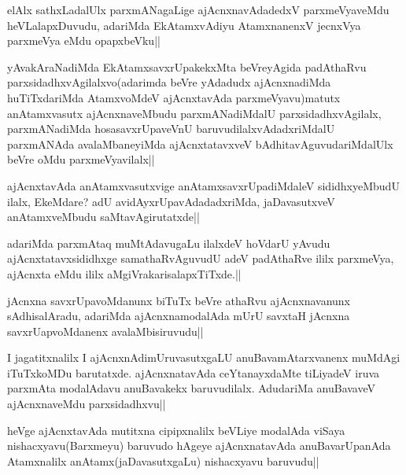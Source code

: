 \begin{artha}
elAlx sathxLadalUlx parxmANagaLige ajAcnxnavAdadedxV parxmeVyaveMdu heVLalapxDuvudu, adariMda EkAtamxvAdiyu AtamxnanenxV jecnxVya parxmeVya eMdu opapxbeVku||
\end{artha}

\begin{artha}
yAvakAraNadiMda EkAtamxsavxrUpakekxMta beVreyAgida padAthaRvu parxsidadhxvAgilalxvo(adarimda beVre yAdadudx ajAcnxnadiMda huTiTxdariMda AtamxvoMdeV ajAcnxtavAda parxmeVyavu)matutx anAtamxvasutx ajAcnxnaveMbudu parxmANadiMdalU parxsidadhxvAgilalx, parxmANadiMda hosasavxrUpaveVnU baruvudilalxvAdadxriMdalU parxmANAda avalaMbaneyiMda ajAcnxtatavxveV bAdhitavAguvudariMdalUlx beVre oMdu parxmeVyavilalx||
\end{artha}

\begin{artha}
ajAcnxtavAda anAtamxvasutxvige anAtamxsavxrUpadiMdaleV sididhxyeMbudU ilalx, EkeMdare? adU avidAyxrUpavAdadadxriMda, jaDavasutxveV anAtamxveMbudu saMtavAgirutatxde||
\end{artha}

\begin{artha}
adariMda parxmAtaq muMtAdavugaLu ilalxdeV hoVdarU yAvudu ajAcnxtatavxsididhxge samathaRvAguvudU adeV padAthaRve ililx parxmeVya, ajAcnxta eMdu ililx aMgiVrakarisalapxTiTxde.||
\end{artha}


\begin{artha}
jAcnxna savxrUpavoMdanunx biTuTx beVre athaRvu ajAcnxnavanunx sAdhisalAradu, adariMda ajAcnxnamodalAda mUrU savxtaH jAcnxna savxrUapvoMdanenx avalaMbisiruvudu||
\end{artha}

\begin{artha}
I jagatitxnalilx I ajAcnxnAdimUruvasutxgaLU anuBavamAtarxvanenx muMdAgi iTuTxkoMDu barutatxde. ajAcnxnatavAda ceYtanayxdaMte tiLiyadeV iruva parxmAta modalAdavu anuBavakekx baruvudilalx. AdudariMa anuBavaveV ajAcnxnaveMdu parxsidadhxvu||
\end{artha}


\begin{artha}
heVge ajAcnxtavAda mutitxna cipipxnalilx beVLiye modalAda viSaya nishacxyavu(Barxmeyu) baruvudo hAgeye ajAcnxnatavAda anuBavarUpanAda Atamxnalilx anAtamx(jaDavasutxgaLu) nishacxyavu baruvudu||
\end{artha}

